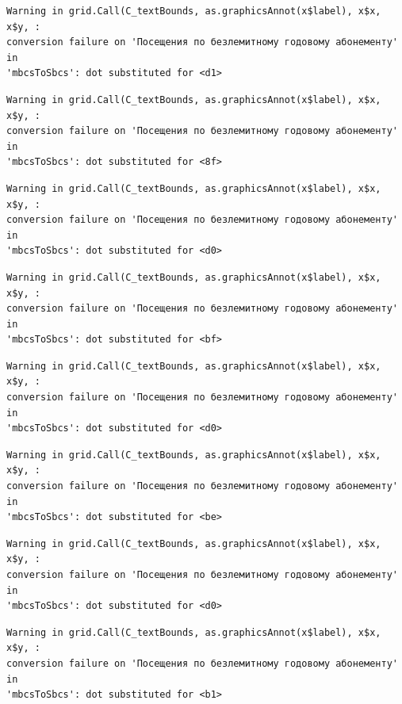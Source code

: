 \documentclass[
  letterpaper,
  DIV=11,
  numbers=noendperiod]{scrartcl}
\begin{document}
\begin{verbatim}
Warning in grid.Call(C_textBounds, as.graphicsAnnot(x$label), x$x, x$y, :
conversion failure on 'Посещения по безлемитному годовому абонементу' in
'mbcsToSbcs': dot substituted for <d1>
\end{verbatim}

\begin{verbatim}
Warning in grid.Call(C_textBounds, as.graphicsAnnot(x$label), x$x, x$y, :
conversion failure on 'Посещения по безлемитному годовому абонементу' in
'mbcsToSbcs': dot substituted for <8f>
\end{verbatim}

\begin{verbatim}
Warning in grid.Call(C_textBounds, as.graphicsAnnot(x$label), x$x, x$y, :
conversion failure on 'Посещения по безлемитному годовому абонементу' in
'mbcsToSbcs': dot substituted for <d0>
\end{verbatim}

\begin{verbatim}
Warning in grid.Call(C_textBounds, as.graphicsAnnot(x$label), x$x, x$y, :
conversion failure on 'Посещения по безлемитному годовому абонементу' in
'mbcsToSbcs': dot substituted for <bf>
\end{verbatim}

\begin{verbatim}
Warning in grid.Call(C_textBounds, as.graphicsAnnot(x$label), x$x, x$y, :
conversion failure on 'Посещения по безлемитному годовому абонементу' in
'mbcsToSbcs': dot substituted for <d0>
\end{verbatim}

\begin{verbatim}
Warning in grid.Call(C_textBounds, as.graphicsAnnot(x$label), x$x, x$y, :
conversion failure on 'Посещения по безлемитному годовому абонементу' in
'mbcsToSbcs': dot substituted for <be>
\end{verbatim}

\begin{verbatim}
Warning in grid.Call(C_textBounds, as.graphicsAnnot(x$label), x$x, x$y, :
conversion failure on 'Посещения по безлемитному годовому абонементу' in
'mbcsToSbcs': dot substituted for <d0>
\end{verbatim}

\begin{verbatim}
Warning in grid.Call(C_textBounds, as.graphicsAnnot(x$label), x$x, x$y, :
conversion failure on 'Посещения по безлемитному годовому абонементу' in
'mbcsToSbcs': dot substituted for <b1>
\end{verbatim}
\end{document}
